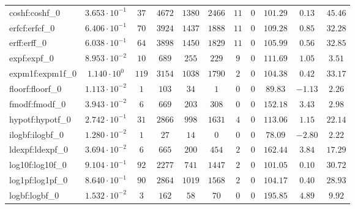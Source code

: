 \begin{tabular}{|l|c|c|c|c|c|c|c|c|c|c|}
coshf:coshf\_0               & $ 3.653 \cdot 10^{-1} $ & $ 37     $ & $ 4672  $ & $ 1380  $ & $ 2466  $ & $ 11  $ & $ 0 $ & $ 101.29      $ & $ 0.13    $ & $ 45.46   $ \\
erfcf:erfcf\_0               & $ 6.406 \cdot 10^{-1} $ & $ 70     $ & $ 3924  $ & $ 1437  $ & $ 1888  $ & $ 11  $ & $ 0 $ & $ 109.28      $ & $ 0.85    $ & $ 32.28   $ \\
erff:erff\_0                 & $ 6.038 \cdot 10^{-1} $ & $ 64     $ & $ 3898  $ & $ 1450  $ & $ 1829  $ & $ 11  $ & $ 0 $ & $ 105.99      $ & $ 0.56    $ & $ 32.85   $ \\
expf:expf\_0                 & $ 8.953 \cdot 10^{-2} $ & $ 10     $ & $ 689   $ & $ 255   $ & $ 229   $ & $ 9   $ & $ 0 $ & $ 111.69      $ & $ 1.05    $ & $ 3.51    $ \\
expm1f:expm1f\_0             & $ 1.140 \cdot 10^{0}  $ & $ 119    $ & $ 3154  $ & $ 1038  $ & $ 1790  $ & $ 2   $ & $ 0 $ & $ 104.38      $ & $ 0.42    $ & $ 33.17   $ \\
floorf:floorf\_0             & $ 1.113 \cdot 10^{-2} $ & $ 1      $ & $ 103   $ & $ 34    $ & $ 1     $ & $ 0   $ & $ 0 $ & $ 89.83       $ & $ -1.13   $ & $ 2.26    $ \\
fmodf:fmodf\_0               & $ 3.943 \cdot 10^{-2} $ & $ 6      $ & $ 669   $ & $ 203   $ & $ 308   $ & $ 0   $ & $ 0 $ & $ 152.18      $ & $ 3.43    $ & $ 2.98    $ \\
hypotf:hypotf\_0             & $ 2.742 \cdot 10^{-1} $ & $ 31     $ & $ 2866  $ & $ 998   $ & $ 1631  $ & $ 4   $ & $ 0 $ & $ 113.06      $ & $ 1.15    $ & $ 22.14   $ \\
ilogbf:ilogbf\_0             & $ 1.280 \cdot 10^{-2} $ & $ 1      $ & $ 27    $ & $ 14    $ & $ 0     $ & $ 0   $ & $ 0 $ & $ 78.09       $ & $ -2.80   $ & $ 2.22    $ \\
ldexpf:ldexpf\_0             & $ 3.694 \cdot 10^{-2} $ & $ 6      $ & $ 665   $ & $ 200   $ & $ 454   $ & $ 2   $ & $ 0 $ & $ 162.44      $ & $ 3.84    $ & $ 17.29   $ \\
log10f:log10f\_0             & $ 9.104 \cdot 10^{-1} $ & $ 92     $ & $ 2277  $ & $ 741   $ & $ 1447  $ & $ 2   $ & $ 0 $ & $ 101.05      $ & $ 0.10    $ & $ 30.72   $ \\
log1pf:log1pf\_0             & $ 8.640 \cdot 10^{-1} $ & $ 90     $ & $ 2864  $ & $ 1019  $ & $ 1568  $ & $ 2   $ & $ 0 $ & $ 104.17      $ & $ 0.40    $ & $ 28.93   $ \\
logbf:logbf\_0               & $ 1.532 \cdot 10^{-2} $ & $ 3      $ & $ 162   $ & $ 58    $ & $ 70    $ & $ 0   $ & $ 0 $ & $ 195.85      $ & $ 4.89    $ & $ 9.92    $ \\

\end{tabular}
